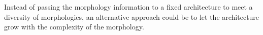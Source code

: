 Instead of passing the morphology information to a fixed architecture to meet a diversity of morphologies, an alternative approach could be to let the architecture grow with the complexity of the morphology.